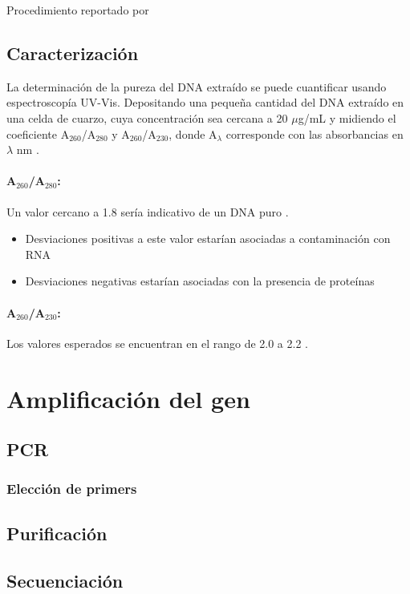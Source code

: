 \documentclass[12pt]{article}
\begin{document}
			\begin{flushright}
				Procedimiento reportado por \citeauthor{puregeneBook}
			\end{flushright}
		
		\subsection{Caracterizaci\'on}
			La determinaci\'on de la pureza del DNA extra\'ido se puede cuantificar usando espectroscop\'ia UV-Vis. Depositando una peque\~na cantidad del DNA extra\'ido en una celda de cuarzo, cuya concentraci\'on sea cercana a 20 $\mu$g/mL y midiendo el coeficiente A$_{260}$/A$_{280}$ y A$_{260}$/A$_{230}$, donde A$_\lambda$ corresponde con las absorbancias en $\lambda$ nm \cite{olson2012dna}.
			\paragraph{A$_{260}$/A$_{280}$:} Un valor cercano a 1.8 ser\'ia indicativo de un DNA puro \cite{wilfinger1997effect, green2012molecular}.
			\begin{itemize}
				\item Desviaciones positivas a este valor estar\'ian asociadas a contaminaci\'on con RNA
				\item Desviaciones negativas estar\'ian asociadas con la presencia de prote\'inas
			\end{itemize}
			\paragraph{A$_{260}$/A$_{230}$:} Los valores esperados se encuentran en el rango de 2.0 a 2.2 \cite{green2012molecular}.
			
	\section{Amplificaci\'on del gen}
		\subsection{PCR}
			\subsubsection{Elecci\'on de primers}
		\subsection{Purificaci\'on}
		\subsection{Secuenciaci\'on}
\end{document}
